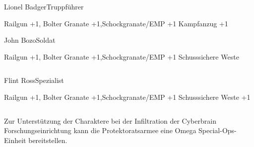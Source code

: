 \begin{column}[l]{0.45}
    \begin{nscsheet}[h]{Lionel Badger\newline{}Truppführer}
        \nscstats[ATT=2,AGG=2]
        \nscruler
        \begin{nscinventory}
            \nscitem[Waffen] Railgun +1, Bolter
            \nscitem[Granaten] Granate +1,\newline{}Schockgranate/EMP +1
            \nscitem[Rüstung] Kampfanzug +1
        \end{nscinventory}
    \end{nscsheet}

    \begin{nscsheet}[h]{John Bozo\newline{}Soldat}
        \nscstats[ATT=2,AGG=2]
        \nscruler
        \begin{nscinventory}
            \nscitem[Waffen] Railgun +1, Bolter
            \nscitem[Granaten] Granate +1,\newline{}Schockgranate/EMP +1
            \nscitem[Rüstung] Schusssichere Weste
        \end{nscinventory}
    \end{nscsheet}
\end{column}
\begin{column}[r]{0.45}
    \begin{nscsheet}[h]{Flint Ross\newline{}Spezialist}
        \nscstats[ATT=2,AGG=1,DEX=3]
        \nscruler
        \begin{nscinventory}
            \nscitem[Waffen] Railgun +1, Bolter
            \nscitem[Granaten] Granate +1,\newline{}Schockgranate/EMP +1
            \nscitem[Rüstung] Schusssichere Weste +1
        \end{nscinventory}
    \end{nscsheet}
\end{column}
\vfill

\pagebreak
{}

Zur Unterstützung der Charaktere bei der Infiltration der Cyberbrain Forschungseinrichtung kann die Protektoratsarmee eine 
Omega Special-Ops-Einheit bereitstellen.


